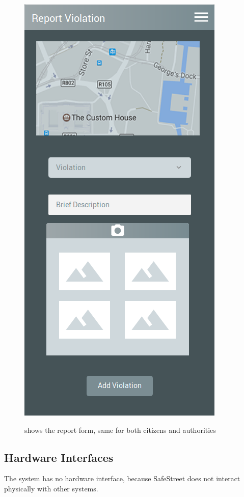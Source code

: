 \documentclass[../RASD.tex]{subfiles}
\begin{document}
            \begin{figure}[H]
                \centering
                \includegraphics[scale = 0.4]{assets/report.png}\\[1.6 cm]
                \caption[Report a violation \textit{Mockup}]{shows the report form, same for both citizens and authorities}
            \end{figure}
            \subsection{Hardware Interfaces}\label{subsec:hardware-interfaces}
        The system has no hardware interface, because SafeStreet does not interact physically with other systems.
\end{document}
